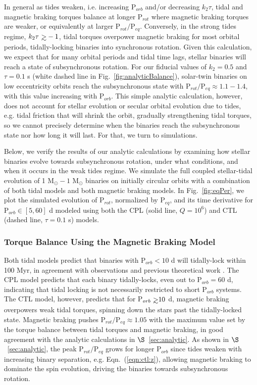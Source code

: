 \documentclass[twocolumn]{aastex61}
\def\gsim{~\rlap{$>$}{\lower 1.0ex\hbox{$\sim$}}}
\begin{document}
In general as tides weaken, i.e. increasing P$_{orb}$ and/or decreasing $k_2 \tau$, tidal and magnetic braking torques balance at longer P$_{rot}$ where magnetic braking torques are weaker, or equivalently at larger P$_{rot}/$P$_{eq}$. Conversely, in the strong tides regime, $k_2 \tau \gsim -1$, tidal torques overpower magnetic braking for most orbital periods, tidally-locking binaries into synchronous rotation. Given this calculation, we expect that for many orbital periods and tidal time lags, stellar binaries will reach a state of subsynchronous rotation. For our fiducial values of $k_2 = 0.5$ and $\tau = 0.1$ s (white dashed line in Fig.~\ref{fig:analyticBalance}), solar-twin binaries on low eccentricity orbits reach the subsynchronous state with P$_{rot}/$P$_{eq} \approx 1.1-1.4$, with this value increasing with P$_{orb}$. This simple analytic calculation, however, does not account for stellar evolution or secular orbital evolution due to tides, e.g. tidal friction that will shrink the orbit, gradually strengthening tidal torques, so we cannot precisely determine when the binaries reach the subsynchronous state nor how long it will last. For that, we turn to simulations.  

Below, we verify the results of our analytic calculations by examining how stellar binaries evolve towards subsynchronous rotation, under what conditions, and when it occurs in the weak tides regime. We simulate the full coupled stellar-tidal evolution of 1 M$_{\odot} - 1$ M$_{\odot}$ binaries on initially circular orbits with a combination of both tidal models and both magnetic braking models. In Fig.~\ref{fig:eqPer}, we plot the simulated evolution of P$_{rot}$, normalized by P$_{eq}$, and its time derivative for P$_{orb} \in [5,60]$ d modeled using both the CPL (solid line, $Q=10^6$) and CTL (dashed line, $\tau = 0.1$ s) models. 

\subsubsection{Torque Balance Using the \citet{Matt2015} Magnetic Braking Model} \label{sec:mattBalance}

Both tidal models predict that binaries with P$_{orb} < 10$ d will tidally-lock within 100 Myr, in agreement with observations \citep{Meibom2005} and previous theoretical work \citep{Zahn1989}. The CPL model predicts that each binary tidally-locks, even out to P$_{orb} = 60$ d, indicating that tidal locking is not necessarily restricted to short P$_{orb}$ systems. The CTL model, however, predicts that for P$_{orb} \gsim 10$ d, magnetic braking overpowers weak tidal torques, spinning down the stars past the tidally-locked state. Magnetic braking pushes P$_{rot}/$P$_{eq} \approx 1.05$ with the maximum value set by the torque balance between tidal torques and magnetic braking, in good agreement with the analytic calculations in $\S$~\ref{sec:analytic}. As shown in $\S$~\ref{sec:analytic}, the peak P$_{rot}/$P$_{eq}$ grows for longer P$_{orb}$ since tides weaken with increasing binary separation, e.g. Eqn.~(\ref{eqn:ctl:z}), allowing magnetic braking to dominate the spin evolution, driving the binaries towards subsynchronous rotation. 
\end{document}
